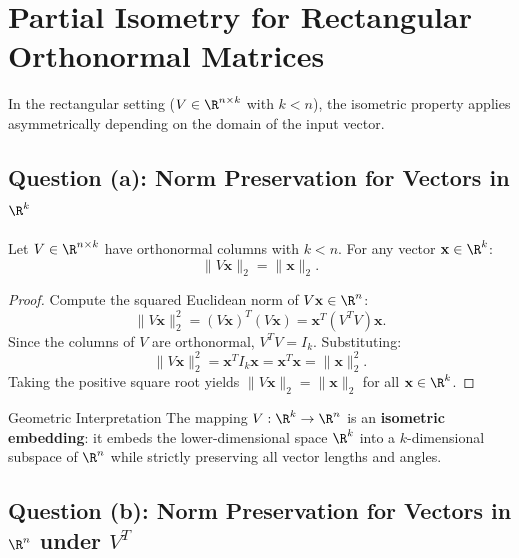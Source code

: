 \FloatBarrier
\section[Partial Isometry for Orthonormal Matrices]{Partial Isometry for Rectangular\\Orthonormal Matrices}

In the rectangular setting ($V \in \R^{n \times k}$ with $k < n$), the isometric property applies asymmetrically depending on the domain of the input vector.

\subsection{Question (a): Norm Preservation for Vectors in \texorpdfstring{$\R^k$}{R\textasciicircum k}}

\begin{proposition}
\label{prop:right-isometry}
Let $V \in \R^{n \times k}$ have orthonormal columns with $k < n$. For any vector $\mathbf{x} \in \R^k$:
\begin{equation}
    \|V\mathbf{x}\|_2 = \|\mathbf{x}\|_2.
\end{equation}
\end{proposition}

\begin{proof}
Compute the squared Euclidean norm of $V\mathbf{x} \in \R^n$:
\begin{equation}
    \|V\mathbf{x}\|_2^2 = (V\mathbf{x})^T (V\mathbf{x}) = \mathbf{x}^T (V^T V) \mathbf{x}.
\end{equation}
Since the columns of $V$ are orthonormal, $V^T V = I_k$. Substituting:
\begin{equation}
    \|V\mathbf{x}\|_2^2 = \mathbf{x}^T I_k \mathbf{x} = \mathbf{x}^T \mathbf{x} = \|\mathbf{x}\|_2^2.
\end{equation}
Taking the positive square root yields $\|V\mathbf{x}\|_2 = \|\mathbf{x}\|_2$ for all $\mathbf{x} \in \R^k$.
\end{proof}

\begin{noteblock}{Geometric Interpretation}
The mapping $V: \R^k \to \R^n$ is an \textbf{isometric embedding}: it embeds the lower-dimensional space $\R^k$ into a $k$-dimensional subspace of $\R^n$ while strictly preserving all vector lengths and angles.
\end{noteblock}

\subsection{Question (b): Norm Preservation for Vectors in \texorpdfstring{$\R^n$}{R\textasciicircum n} under \texorpdfstring{$V^T$}{V\textasciicircum T}}

